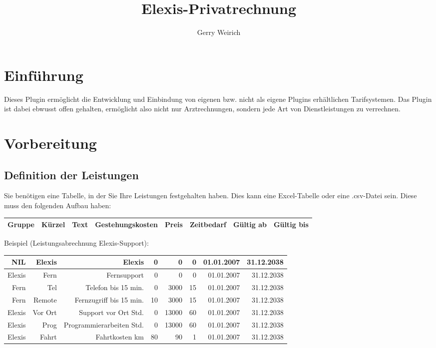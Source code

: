 \documentclass[a4paper]{scrartcl}
\begin{document}
\title{Elexis-Privatrechnung}
\author{Gerry Weirich}
\maketitle

\section{Einführung}
Dieses Plugin ermöglicht die Entwicklung und Einbindung von eigenen bzw. nicht als eigene Plugins erhältlichen Tarifsystemen. Das Plugin ist dabei ebwusst offen gehalten, ermöglicht also nicht nur Arztrechnungen, sondern jede Art von Dienstleistungen zu verrechnen.

\section{Vorbereitung}
\subsection{Definition der Leistungen}
Sie benötigen eine Tabelle, in der Sie Ihre Leistungen festgehalten haben. Dies kann eine Excel-Tabelle oder eine .csv-Datei sein. Diese muss den folgenden Aufbau haben:
\medskip
\begin{tabular}[h]{|r|r|r|r|r|r|r|r|}
\hline Gruppe & Kürzel & Text & Gestehungskosten & Preis & Zeitbedarf & Gültig ab & Gültig bis\\
\hline
\end{tabular}

\medskip
Beispiel (Leistungsabrechnung Elexis-Support):

\begin{tabular}[h]{|r|r|r|r|r|r|r|r|}
\hline NIL & Elexis & Elexis & 0 & 0 & 0 & 01.01.2007 & 31.12.2038\\
\hline Elexis & Fern & Fernsupport & 0 & 0 & 0 & 01.01.2007 & 31.12.2038\\
\hline Fern & Tel & Telefon bis 15 min. & 0 & 3000 & 15 &  01.01.2007 & 31.12.2038\\
\hline Fern & Remote & Fernzugriff bis 15 min. & 10 & 3000 & 15 &  01.01.2007 & 31.12.2038\\
\hline Elexis & Vor Ort & Support vor Ort Std. & 0 & 13000 & 60 & 01.01.2007 & 31.12.2038\\
\hline Elexis & Prog & Programmierarbeiten Std. & 0 & 13000 & 60 & 01.01.2007 & 31.12.2038\\
\hline Elexis & Fahrt & Fahrtkosten km & 80 & 90 & 1 & 01.01.2007 & 31.12.2038\\
\hline
\end{tabular}
\end{document}
